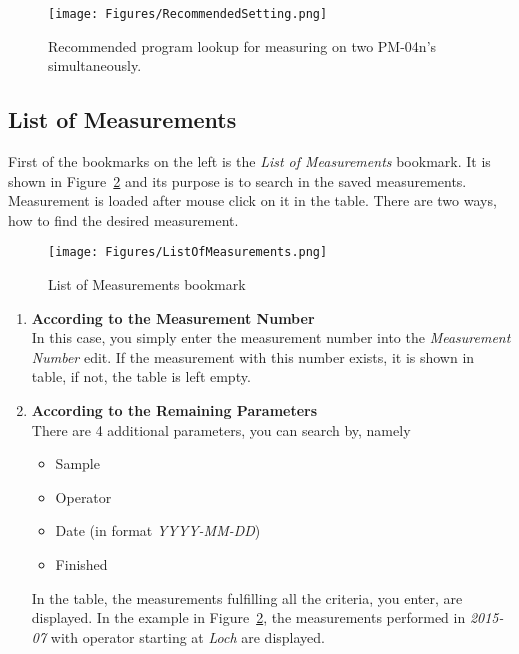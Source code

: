 \documentclass[a4paper,11pt,oneside]{report}
\theoremstyle{named}
\begin{document}
\begin{figure}[t]
  \centering
  \texttt{[image: Figures/RecommendedSetting.png]}
  \caption{Recommended program lookup for measuring on two PM-04n's
  simultaneously.}
  \label{fig:RecommendeSetting}
\end{figure}

\subsection{List of Measurements}
\label{sec:ListOfMeasurements}

First of the bookmarks on the left is the \textit{List of Measurements}
bookmark. It is shown in Figure~\ref{fig:ListOfMeasurements} and its purpose is
to search in the saved measurements. Measurement is loaded after mouse click on
it in the table. There are two ways, how to find the desired measurement.  

\begin{figure}[t]
  \centering
  \texttt{[image: Figures/ListOfMeasurements.png]}
  \caption{List of Measurements bookmark}
  \label{fig:ListOfMeasurements}
\end{figure}

\begin{enumerate}
  \item \textbf{According to the Measurement Number} \\
    In this case, you simply enter the measurement number into the
    \textit{Measurement Number} edit. If the measurement with this number
    exists, it is shown in table, if not, the table is left empty.
  \item \textbf{According to the Remaining Parameters} \\
    There are 4 additional parameters, you can search by, namely
    \begin{itemize}
      \item Sample 
      \item Operator
      \item Date (in format \textit{YYYY-MM-DD})
      \item Finished
    \end{itemize}
    In the table, the measurements fulfilling all the criteria, you enter, are
    displayed. In the example in Figure~\ref{fig:ListOfMeasurements}, the
    measurements performed in \textit{2015-07} with operator starting at
    \textit{Loch} are displayed. 
\end{enumerate}
\end{document}
